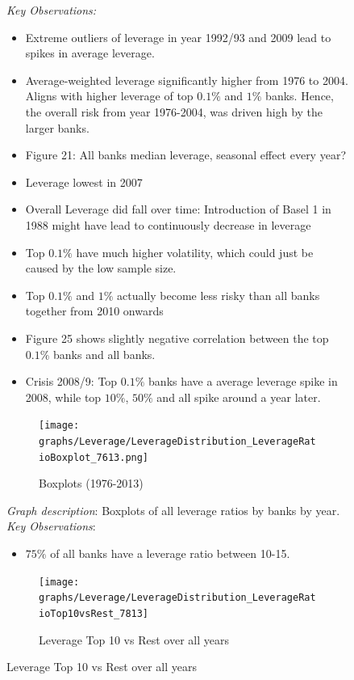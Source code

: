 \documentclass[12pt, a4paper]{article} %
\begin{document}
\begin{figure}[hbtp]
\noindent \textit{Key Observations:}
\begin{itemize}
\item Extreme outliers of leverage in year 1992/93 and 2009 lead to spikes in average leverage.
\item Average-weighted leverage significantly higher from 1976 to 2004. Aligns with higher leverage of top $0.1\%$ and $1\%$ banks. Hence, the overall risk from year 1976-2004, was driven high by the larger banks. 
\item Figure 21: All banks median leverage, seasonal effect every year?
\item Leverage lowest in 2007
\item Overall Leverage did fall over time: Introduction of Basel 1 in 1988 might have lead to continuously decrease in leverage
\item Top $0.1\%$ have much higher volatility, which could just be caused by the low sample size.
\item Top $0.1\%$ and $1\%$ actually become less risky than all banks together from 2010 onwards
\item Figure 25 shows slightly negative correlation between the top $0.1\%$ banks and all banks. 
\item Crisis 2008/9: Top $0.1\%$ banks have a average leverage spike in 2008, while top $10\%$, $50\%$ and all  spike around a year later.  
\end{itemize}

\newpage

\begin{figure}[hbtp]
\centering
\caption{Boxplots (1976-2013)}
\texttt{[image: graphs/Leverage/LeverageDistribution\_LeverageRatioBoxplot\_7613.png]}
\end{figure}

\noindent \textit{Graph description}: Boxplots of all leverage ratios by banks by year. 
\\

\noindent \textit{Key Observations}:
\begin{itemize}
\item $75\%$ of all banks have a leverage ratio between 10-15.
\end{itemize}



\iffalse
\begin{figure}[hbtp]
\centering
\caption{Leverage Top 10 vs Rest over all years}
\texttt{[image: graphs/Leverage/LeverageDistribution\_LeverageRatioTop10vsRest\_7813]}
\end{figure}



\end{figure}
\end{document}
